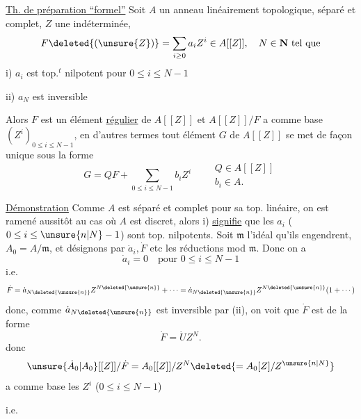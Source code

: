 \uline{Th. de préparation ``formel''} Soit $A$ un anneau linéairement topologique, séparé et complet, $Z$ une indéterminée,
\[
F\deleted{(\unsure{Z})}=\sum_{i\geq0}a_iZ^i\in A[[Z]],\quad N\in\mathbf N\text{ tel que}
\]
i) $a_i$ est top.$^t$ nilpotent pour $0\leq i\leq N-1$

ii) $a_N$ est inversible

Alors $F$ est un élément \uline{régulier} de $A[[Z]]$ et $A[[Z]]/F$ a comme base $(Z^i)_{0\leq i\leq N-1}$, en d'autres termes tout élément $G$ de $A[[Z]]$ se met de façon unique sous la forme
\[
G=QF+\sum_{0\leq i\leq N-1}b_iZ^i\qquad
\begin{array}{l}Q\in A[[Z]]\\b_i\in A.\end{array}
\]

\uline{Démonstration} Comme $A$ est séparé et complet pour sa top. linéaire, on est ramené aussitôt au cas où $A$ est discret, alors i) \uline{signifie} que les $a_i$ ($0\leq i\leq\unsure{n|N}-1$) sont top. nilpotents. Soit $\mathfrak m$ l'idéal  qu'ils engendrent, $A_0=A/\mathfrak m$, et désignons par $\dot a_i,\dot F$ etc les réductions mod $\mathfrak m$.  Donc on a 
\[
\dot a_i=0\quad\text{pour }0\leq i\leq N-1
\]
i.e.
\[
\dot F=\dot a_{N\deleted{\unsure{n}}}Z^{N\deleted{\unsure{n}}}+\cdots
=\dot a_{N\deleted{\unsure{n}}}Z^{N\deleted{\unsure{n}}}(1+\cdots)
\]
donc, comme $\dot a_{N\deleted{\unsure{n}}}$ est inversible par (ii), on voit que $\dot F$ est de la forme
\[
\dot F=\dot U Z^N.
\]
 donc
\[
\unsure{\dot A_0|A_0}[[Z]]/\dot F=A_0[[Z]]/Z^N\deleted{=A_0[Z]/Z^{\unsure{n|N}}}
\]
a comme base les $Z^i$ ($0\leq i\leq N-1$)

i.e.
